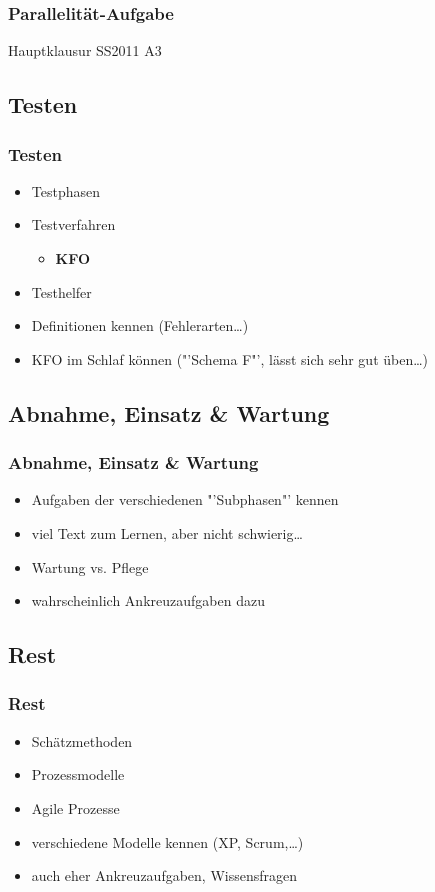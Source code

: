 \documentclass[18pt]{beamer}
\begin{document}
	\begin{frame}
		\frametitle{Parallelität-Aufgabe}
		\begin{huge}
				\centering Hauptklausur SS2011 A3
		\end{huge}
	\end{frame}
	
	\subsection{Testen}
	\begin{frame}
		\frametitle{Testen}
		\begin{itemize}
			\item Testphasen \pause
			\item Testverfahren
			\begin{itemize}
				\item \textbf{KFO} \pause
			\end{itemize}
			\item Testhelfer \pause
			\item Definitionen kennen (Fehlerarten\dots) \pause
			\item KFO im Schlaf können ("'Schema F"', lässt sich sehr gut üben\dots)
		\end{itemize}
	\end{frame}
	
	\subsection{Abnahme, Einsatz \& Wartung}
	\begin{frame}
		\frametitle{Abnahme, Einsatz \& Wartung}
		\begin{itemize}
			\item Aufgaben der verschiedenen "'Subphasen"' kennen \pause
			\item viel Text zum Lernen, aber nicht schwierig\dots \pause
			\item Wartung vs. Pflege \pause
			\item wahrscheinlich Ankreuzaufgaben dazu
		\end{itemize}
	\end{frame}

	\subsection{Rest}
	\begin{frame}
		\frametitle{Rest}
		\begin{itemize}
			\item Schätzmethoden \pause
			\item Prozessmodelle \pause
			\item Agile Prozesse \pause
			\item verschiedene Modelle kennen (XP, Scrum,\dots) \pause
			\item auch eher Ankreuzaufgaben, Wissensfragen
		\end{itemize}
	\end{frame}
\end{document}
